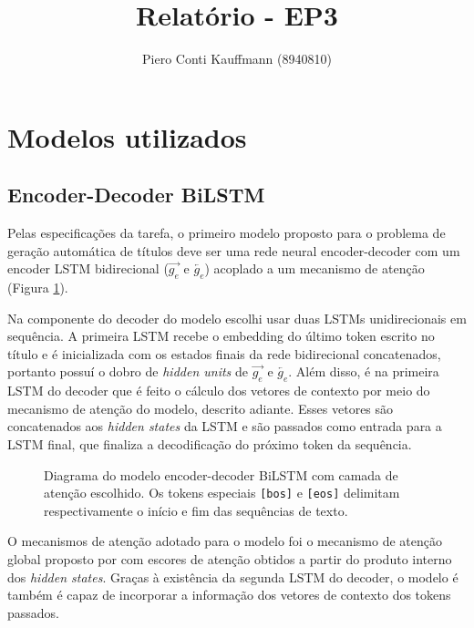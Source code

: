 \documentclass{article}
\title{Relatório - EP3}
\author{Piero Conti Kauffmann (8940810)}
\date{}
\begin{document}
\maketitle

\section{Modelos utilizados}

\subsection{Encoder-Decoder BiLSTM}

Pelas especificações da tarefa, o primeiro modelo proposto para o problema de geração automática de títulos  deve ser uma rede neural encoder-decoder com um encoder LSTM bidirecional ($\overrightarrow{g_{e}}$ e $\overleftarrow{g_{e}}$) acoplado a um mecanismo de atenção (Figura \ref{lstm_fig}). 

Na componente do decoder do modelo escolhi usar duas LSTMs unidirecionais em sequência. A primeira LSTM recebe o embedding do último token escrito no título e é inicializada com os estados finais da rede bidirecional concatenados, portanto possuí o dobro de \textit{hidden units} de $\overrightarrow{g_{e}}$ e $\overleftarrow{g_{e}}$. Além disso, é na primeira LSTM do decoder que é feito o cálculo dos vetores de contexto por meio do mecanismo de atenção do modelo, descrito adiante. Esses vetores são concatenados aos \textit{hidden states} da LSTM e são passados como entrada para a LSTM final, que finaliza a decodificação do próximo token da sequência.

\vspace{2em}

\begin{figure}[h]
\centering

\caption{Diagrama do modelo encoder-decoder BiLSTM com camada de atenção escolhido. Os tokens especiais \texttt{[bos]} e \texttt{[eos]} delimitam respectivamente o início e fim das sequências de texto.}
\label{lstm_fig}
\end{figure}

O mecanismos de atenção adotado para o modelo foi o mecanismo de atenção global proposto por \textcite{luong2015effective} com escores de atenção obtidos a partir do produto interno dos \textit{hidden states}. Graças à existência da segunda LSTM do decoder, o modelo é também é capaz de incorporar a informação dos vetores de contexto dos tokens passados.
\end{document}
